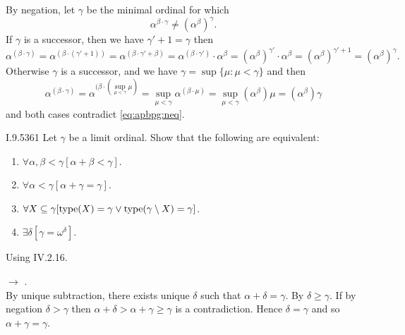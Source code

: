 By negation, let \(\gamma\) be the minimal ordinal for which
\begin{equation} \label{eq:apbpg:neq}
\alpha^{\beta\cdot\gamma} \neq  \left(\alpha^\beta\right)^\gamma.
\end{equation}
If \(\gamma\) is a successor, then we have \(\gamma'+1=\gamma\)
then
\begin{equation*}
\alpha^{(\beta\cdot\gamma)}
= \alpha^{(\beta\cdot(\gamma'+1))}
= \alpha^{(\beta\cdot\gamma'+\beta)}
= \alpha^{(\beta\cdot\gamma')}\cdot\alpha^\beta
= \left(\alpha^\beta\right)^{\gamma'}\cdot\alpha^\beta
= \left(\alpha^\beta\right)^{\gamma'+1}
= \left(\alpha^\beta\right)^\gamma.
\end{equation*}
Otherwise \(\gamma\) is a successor,
and we have \(\gamma = \sup\{\mu: \mu<\gamma\}\) and then
\begin{equation*}
\alpha^{(\beta\cdot\gamma)}
= \alpha^{(\beta\cdot(\sup_{\mu<\gamma}\mu)}
= \sup_{\mu<\gamma}\alpha^{(\beta\cdot\mu)}
= \sup_{\mu<\gamma}\left(\alpha^\beta\right)\mu
= \left(\alpha^\beta\right)\gamma
\end{equation*}
and both cases contradict \eqref{eq:apbpg:neq}.

\begin{lexcopy}{I.9.53}{61}
Let \(\gamma\) be a limit ordinal. Show that the following are 
equivalent:
\begin{enumerate}
\renewcommand{\theenumi}{\alph{enumi}}
\item
\(\forall \alpha,\beta < \gamma [\alpha + \beta < \gamma]\).

\item
\(\forall \alpha < \gamma [ \alpha + \gamma = \gamma]\).

\item
\(\forall X \subseteq \gamma
  [\mathop{\mathrm{type}}(X) = \gamma \lor \mathop{\mathrm{type}}(\gamma\setminus X) = \gamma]\).

\item
\(\exists\delta[\gamma = \omega^\delta]\).
\end{enumerate}
\end{lexcopy}

Using \cite{Levy2002Basic} IV.2.16.

 \(\rightarrow\) .\\
By unique subtraction, there exists unique \(\delta\) such  that
\(\alpha + \delta = \gamma\). By  \(\delta \geq \gamma\).
If by negation \(\delta > \gamma\)
then \(\alpha + \delta > \alpha + \gamma \geq \gamma\)
is a contradiction. Hence \(\delta = \gamma\) and so
\(\alpha + \gamma = \gamma\).

